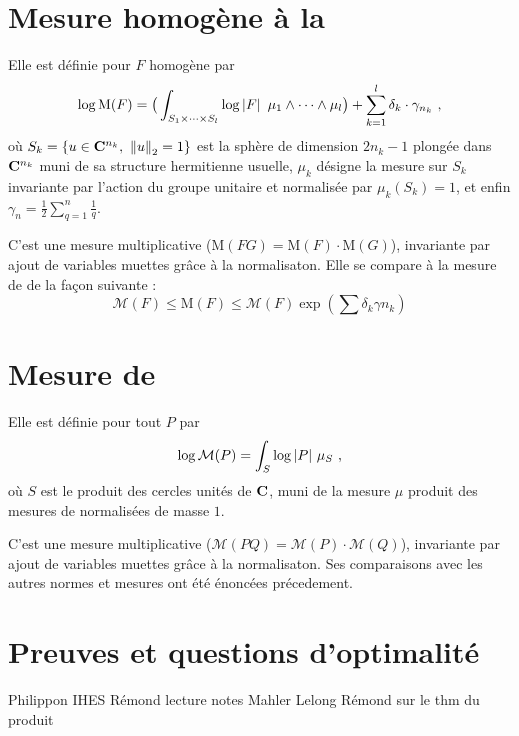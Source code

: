 \documentclass[11pt, twoside, a4paper]{article}
\newcommand*\normeuc[1]{\norm{#1}_2}
\newcommand*\mespph[1]{\mathrm{M}(#1)}
\newcommand*\mahler[1]{\mathcal{M}(#1)}
\begin{document}
\section{Mesure homogène à la \texorpdfstring{}{Philippon}}

Elle est définie pour $F$ homogène par 
\[
  \log \mespph F = \big(\int_{S_{1}\times\cdots\times S_{l}} \log\abs F\ \mu_1
  \wedge \cdots \wedge \mu_l\big) + \sum_{k=1}^l \delta_k \cdot \gamma_{n_k}
  \pmm,
\]
où $S_k = \{ u \in \C^{n_k},\ \normeuc u = 1 \}$ est la sphère de dimension
$2n_k-1$ plongée dans $\mathbf{C}^{n_k}$ muni de sa structure hermitienne usuelle,
$\mu_k$ désigne la mesure sur $S_k$ invariante par l'action du groupe unitaire
et normalisée par $\mu_k(S_k) = 1$, et enfin $\gamma_n = \frac12
\sum_{q=1}^{n} \frac1q$. 

C'est une mesure multiplicative ($\mespph{FG} = \mespph F \cdot \mespph G$),
invariante par ajout de variables muettes grâce à la normalisaton.  Elle se compare à la mesure de
 de la façon suivante :
\begin{equation}
  \mahler F \le \mespph F \le \mahler F \exp(\sum\delta_k\gamma{n_k})
\end{equation}

\section{Mesure de \texorpdfstring{}{Mahler}}

Elle est définie pour tout $P$ par 
\[
  \log\mahler P = \int_S \log\abs P\, \mu_S \pmm,
\]
où $S$ est le produit des cercles unités de $\mathbf{C}$, muni de la mesure $\mu$
produit des mesures de  normalisées de masse $1$. 

C'est une mesure multiplicative ($\mahler{PQ} = \mahler P \cdot \mahler Q$),
invariante par ajout de variables muettes grâce à la normalisaton. 
Ses comparaisons avec les autres normes et mesures ont été énoncées
précedement.

\section{Preuves et questions d'optimalité}


\begin{thebibliography}{9}
   Philippon IHES
   Rémond lecture notes
   Mahler
   Lelong
   Rémond sur le thm du produit
\end{thebibliography}
\end{document}
